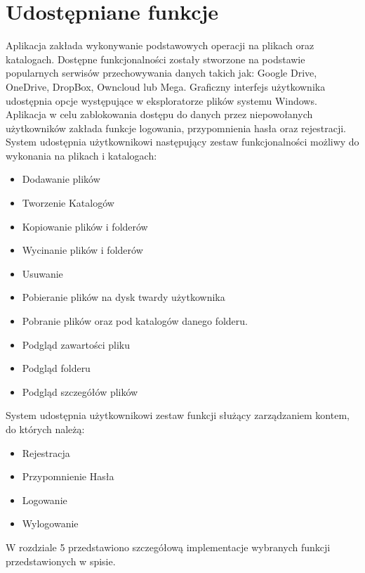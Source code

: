 \section{Udostępniane funkcje}
Aplikacja zakłada wykonywanie podstawowych operacji na plikach oraz katalogach. Dostępne funkcjonalności zostały stworzone na podstawie popularnych serwisów przechowywania danych takich jak: Google Drive, OneDrive, DropBox, Owncloud lub Mega. Graficzny interfejs użytkownika udostępnia opcje występujące w eksploratorze plików systemu Windows. 
Aplikacja w celu zablokowania dostępu do danych przez niepowołanych użytkowników zakłada funkcje logowania, przypomnienia hasła oraz rejestracji.  
\newpage
System udostępnia użytkownikowi następujący zestaw funkcjonalności możliwy do wykonania na plikach i katalogach:
\begin{itemize}[align=left]
	\item Dodawanie plików 
	\item Tworzenie Katalogów
	\item Kopiowanie plików i folderów
	\item Wycinanie plików i folderów
	\item Usuwanie
	\item Pobieranie plików na dysk twardy użytkownika
	\item Pobranie plików oraz pod katalogów danego folderu.
	\item Podgląd zawartości pliku 
	\item Podgląd folderu
	\item Podgląd szczegółów plików
\end{itemize}

System udostępnia użytkownikowi zestaw funkcji  służący zarządzaniem kontem, do których należą:
\begin{itemize}[align=left]
	\item Rejestracja
	\item Przypomnienie Hasła
	\item Logowanie
	\item Wylogowanie
	
	
\end{itemize}


W rozdziale 5 przedstawiono szczegółową implementacje wybranych funkcji przedstawionych w spisie.